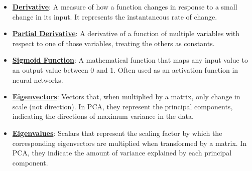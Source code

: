 \documentclass{article}%
\begin{document}
\begin{itemize}[leftmargin=*]
\item \href{https://purdue.brightspace.com/d2l/common/assets/pdfjs-d2l-dist/1.0.14-legacy/web/viewer.html?file=\%2Fcontent\%2Fenforced\%2F1095467-wl.202510.CS.24300.001\%2F04L1-Linear Algebra Primer.pdf\%3Fou\%3D1095467\&lang=en-us\&container=d2l-fileviewer-rendered-pdf\&fullscreen=d2l-fileviewer-rendered-pdf-dialog\&height=667#page=21}{\textbf{Derivative}}: A measure of how a function changes in response to a small change in its input. It represents the instantaneous rate of change.%
\item \href{https://purdue.brightspace.com/d2l/common/assets/pdfjs-d2l-dist/1.0.14-legacy/web/viewer.html?file=\%2Fcontent\%2Fenforced\%2F1095467-wl.202510.CS.24300.001\%2F04L1-Linear Algebra Primer.pdf\%3Fou\%3D1095467\&lang=en-us\&container=d2l-fileviewer-rendered-pdf\&fullscreen=d2l-fileviewer-rendered-pdf-dialog\&height=667#page=19}{\textbf{Partial Derivative}}: A derivative of a function of multiple variables with respect to one of those variables, treating the others as constants.%
\item \href{https://purdue.brightspace.com/d2l/common/assets/pdfjs-d2l-dist/1.0.14-legacy/web/viewer.html?file=\%2Fcontent\%2Fenforced\%2F1095467-wl.202510.CS.24300.001\%2F04L1-Linear Algebra Primer.pdf\%3Fou\%3D1095467\&lang=en-us\&container=d2l-fileviewer-rendered-pdf\&fullscreen=d2l-fileviewer-rendered-pdf-dialog\&height=667#page=21}{\textbf{Sigmoid Function}}: A mathematical function that maps any input value to an output value between 0 and 1. Often used as an activation function in neural networks.%
\item \href{https://purdue.brightspace.com/d2l/common/assets/pdfjs-d2l-dist/1.0.14-legacy/web/viewer.html?file=\%2Fcontent\%2Fenforced\%2F1095467-wl.202510.CS.24300.001\%2F11L2-svd-pca-recommender.pdf\%3Fou\%3D1095467\&lang=en-us\&container=d2l-fileviewer-rendered-pdf\&fullscreen=d2l-fileviewer-rendered-pdf-dialog\&height=667#page=17}{\textbf{Eigenvectors}}: Vectors that, when multiplied by a matrix, only change in scale (not direction). In PCA, they represent the principal components, indicating the directions of maximum variance in the data.%
\item \href{https://purdue.brightspace.com/d2l/common/assets/pdfjs-d2l-dist/1.0.14-legacy/web/viewer.html?file=\%2Fcontent\%2Fenforced\%2F1095467-wl.202510.CS.24300.001\%2F11L2-svd-pca-recommender.pdf\%3Fou\%3D1095467\&lang=en-us\&container=d2l-fileviewer-rendered-pdf\&fullscreen=d2l-fileviewer-rendered-pdf-dialog\&height=667#page=17}{\textbf{Eigenvalues}}: Scalars that represent the scaling factor by which the corresponding eigenvectors are multiplied when transformed by a matrix. In PCA, they indicate the amount of variance explained by each principal component.%
\end{itemize}
\end{document}
